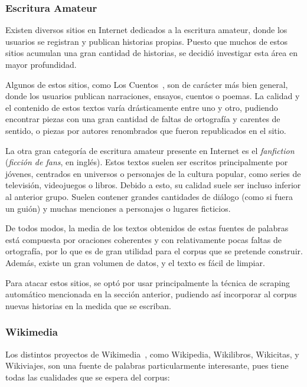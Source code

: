 \subsubsection{Escritura Amateur}

Existen diversos sitios en Internet dedicados a la escritura amateur, donde los usuarios se
registran y publican historias propias. Puesto que muchos de estos sitios acumulan una gran cantidad
de historias, se decidió investigar esta área en mayor profundidad.

Algunos de estos sitios, como Los Cuentos~\cite{LosCuentos}, son de carácter más bien general, donde
los usuarios publican narraciones, ensayos, cuentos o poemas. La calidad y el contenido de estos
textos varía drásticamente entre uno y otro, pudiendo encontrar piezas con una gran cantidad de
faltas de ortografía y carentes de sentido, o piezas por autores renombrados que fueron republicados
en el sitio.

La otra gran categoría de escritura amateur presente en Internet es el \textit{fanfiction}
(\textit{ficción de fans}, en inglés). Estos textos suelen ser escritos principalmente por jóvenes,
centrados en universos o personajes de la cultura popular, como series de televisión, videojuegos o
libros. Debido a esto, su calidad suele ser incluso inferior al anterior grupo. Suelen contener
grandes cantidades de diálogo (como si fuera un guión) y muchas menciones a personajes o lugares
ficticios.

De todos modos, la media de los textos obtenidos de estas fuentes de palabras está compuesta por
oraciones coherentes y con relativamente pocas faltas de ortografía, por lo que es de gran utilidad
para el corpus que se pretende construir. Además, existe un gran volumen de datos, y el texto es
fácil de limpiar.

Para atacar estos sitios, se optó por usar principalmente la técnica de scraping automático
mencionada en la sección anterior, pudiendo así incorporar al corpus nuevas historias en la medida
que se escriban.


\subsubsection{Wikimedia}

Los distintos proyectos de Wikimedia~\cite{Wikimedia}, como Wikipedia, Wikilibros, Wikicitas, y
Wikiviajes, son una fuente de palabras particularmente interesante, pues tiene todas las cualidades
que se espera del corpus:


